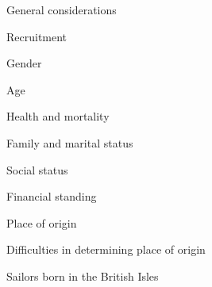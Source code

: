 \begin{listWWNumvleveli}
\item 
\setcounter{listWWNumvlevelii}{0}
\begin{listWWNumvlevelii}
\item 
\begin{styleNormali}
General considerations 
\end{styleNormali}

\item 
\begin{styleNormali}
Recruitment 
\end{styleNormali}

\item 
\begin{styleNormali}
Gender 
\end{styleNormali}

\item 
\begin{styleNormali}
Age 
\end{styleNormali}

\item 
\begin{styleNormali}
Health and mortality 
\end{styleNormali}

\item 
\begin{styleNormali}
Family and marital status 
\end{styleNormali}

\item 
\begin{styleNormali}
Social status 
\end{styleNormali}

\item 
\begin{styleNormali}
Financial standing 
\end{styleNormali}

\item 
\begin{styleNormali}
Place of origin 
\end{styleNormali}


\setcounter{listWWNumvleveliii}{0}
\begin{listWWNumvleveliii}
\item 
\begin{styleNormali}
Difficulties in determining place of origin
\end{styleNormali}

\item 
\begin{styleNormali}
Sailors born in the British Isles 
\end{styleNormali}


\end{listWWNumvleveliii}
\end{listWWNumvlevelii}
\end{listWWNumvleveli}

